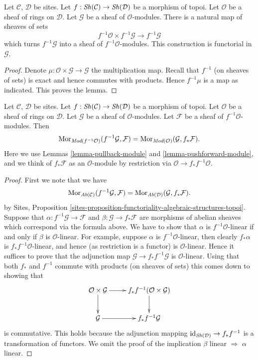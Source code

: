 \begin{lemma}
\label{lemma-pullback-module}
Let $\mathcal{C}$, $\mathcal{D}$ be sites.
Let $f : \mathop{\mathit{Sh}}\nolimits(\mathcal{C}) \to \mathop{\mathit{Sh}}\nolimits(\mathcal{D})$
be a morphism of topoi.
Let $\mathcal{O}$ be a sheaf of rings on $\mathcal{D}$.
Let $\mathcal{G}$ be a sheaf of $\mathcal{O}$-modules.
There is a natural map of sheaves of sets
$$
f^{-1}\mathcal{O} \times f^{-1}\mathcal{G}
\longrightarrow
f^{-1}\mathcal{G}
$$
which turns $f^{-1}\mathcal{G}$ into a sheaf of $f^{-1}\mathcal{O}$-modules.
This construction is functorial in $\mathcal{G}$.
\end{lemma}

\begin{proof}
Denote $\mu : \mathcal{O} \times \mathcal{G} \to \mathcal{G}$ the
multiplication map. Recall that $f^{-1}$ (on sheaves of sets) is exact
and hence commutes with products. Hence $f^{-1}\mu$ is a map as
indicated. This proves the lemma.
\end{proof}

\begin{lemma}
\label{lemma-adjoint-push-pull-modules}
Let $\mathcal{C}$, $\mathcal{D}$ be sites.
Let $f : \mathop{\mathit{Sh}}\nolimits(\mathcal{C}) \to \mathop{\mathit{Sh}}\nolimits(\mathcal{D})$
be a morphism of topoi.
Let $\mathcal{O}$ be a sheaf of rings on $\mathcal{D}$.
Let $\mathcal{G}$ be a sheaf of $\mathcal{O}$-modules.
Let $\mathcal{F}$ be a sheaf of $f^{-1}\mathcal{O}$-modules.
Then
$$
\mathop{\mathrm{Mor}}\nolimits_{\textit{Mod}(f^{-1}\mathcal{O})}(f^{-1}\mathcal{G}, \mathcal{F})
=
\mathop{\mathrm{Mor}}\nolimits_{\textit{Mod}(\mathcal{O})}(\mathcal{G}, f_*\mathcal{F}).
$$
Here we use
Lemmas \ref{lemma-pullback-module}
and \ref{lemma-pushforward-module}, and we think of
$f_*\mathcal{F}$ as an $\mathcal{O}$-module by restriction via
$\mathcal{O} \to f_*f^{-1}\mathcal{O}$.
\end{lemma}

\begin{proof}
First we note that we have
$$
\mathop{\mathrm{Mor}}\nolimits_{\textit{Ab}(\mathcal{C})}(f^{-1}\mathcal{G}, \mathcal{F})
=
\mathop{\mathrm{Mor}}\nolimits_{\textit{Ab}(\mathcal{D})}(\mathcal{G}, f_*\mathcal{F}).
$$
by Sites,
Proposition \ref{sites-proposition-functoriality-algebraic-structures-topoi}.
Suppose that $\alpha : f^{-1}\mathcal{G} \to \mathcal{F}$ and
$\beta : \mathcal{G} \to f_*\mathcal{F}$ are morphisms of abelian
sheaves which correspond via the formula above. We have to show that
$\alpha$ is $f^{-1}\mathcal{O}$-linear if and only if $\beta$
is $\mathcal{O}$-linear. For example, suppose $\alpha$ is
$f^{-1}\mathcal{O}$-linear, then clearly $f_*\alpha$ is
$f_*f^{-1}\mathcal{O}$-linear, and hence (as restriction is a functor)
is $\mathcal{O}$-linear. Hence it suffices to prove that the
adjunction map $\mathcal{G} \to f_*f^{-1}\mathcal{G}$ is
$\mathcal{O}$-linear. Using that both $f_*$ and $f^{-1}$ commute
with products (on sheaves of sets) this comes down to showing that
$$
\xymatrix{
\mathcal{O} \times \mathcal{G} \ar[r] \ar[d] &
f_*f^{-1}(\mathcal{O} \times \mathcal{G}) \ar[d] \\
\mathcal{G} \ar[r] & f_*f^{-1}\mathcal{G}
}
$$
is commutative. This holds because the adjunction mapping
$\text{id}_{\mathop{\mathit{Sh}}\nolimits(\mathcal{D})} \to f_*f^{-1}$ is a
transformation of functors. We omit the proof of the implication
$\beta$ linear $\Rightarrow$ $\alpha$ linear.
\end{proof}

